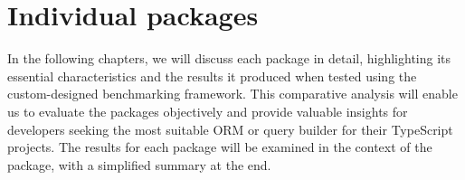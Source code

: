 \chapter{Individual packages}

In the following chapters, we will discuss each package in detail, highlighting
its essential characteristics and the results it produced when tested using the
custom-designed benchmarking framework. This comparative analysis will enable us
to evaluate the packages objectively and provide valuable insights for
developers seeking the most suitable ORM or query builder for their TypeScript
projects. The results for each package will be examined in the context of the
package, with a simplified summary at the end.













